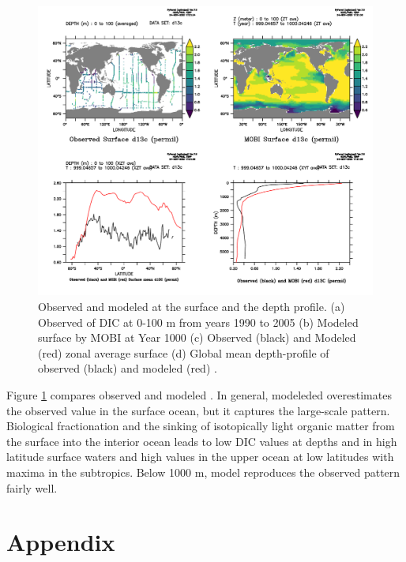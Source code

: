 \documentclass[a4paper]{article}
\begin{document}
\begin{enumerate}
\begin{figure}[h!]   %
   \centering
   \includegraphics[scale=0.5]{MOBI_OBS_C13.pdf}
   \caption[]{Observed and modeled \delta{} at the surface and the depth profile. (a) Observed \delta{} of DIC at 0-100 m from years 1990 to 2005 \citep{Schmittner13}  (b) Modeled surface \delta{} by MOBI at Year 1000 (c) Observed (black) and Modeled (red) zonal average surface \delta{} (d) Global mean depth-profile of observed (black) and modeled (red) \delta{}.}
   \label{fig:c13_mobi}
\end{figure}

Figure \ref{fig:c13_mobi} compares observed and modeled \delta{}. In general, modeleded \delta{} overestimates the observed value in the surface ocean, but it captures the large-scale pattern. Biological fractionation and the sinking of isotopically light \delta{} organic matter from the surface into the interior ocean leads to low \delta{} DIC values at depths and in high latitude surface waters and high values in the upper ocean at low latitudes with maxima in the subtropics. Below 1000 m, model reproduces the observed pattern fairly well.


\end{enumerate}


\section{Appendix}
\end{document}
